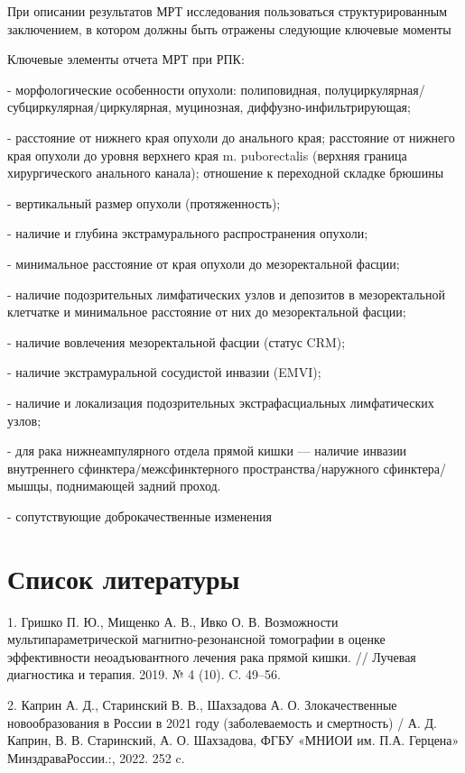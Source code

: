 \documentclass[
  russian,
  12pt,
  a4paper,
]{report}
\begin{document}
При описании результатов МРТ исследования пользоваться структурированным
заключением, в котором должны быть отражены следующие ключевые моменты

Ключевые элементы отчета МРТ при РПК:

- морфологические особенности опухоли: полиповидная, полуциркулярная/
субциркулярная/циркулярная, муцинозная, диффузно-инфильтрирующая;

- расстояние от нижнего края опухоли до анального края; расстояние от
нижнего края опухоли до уровня верхнего края m. puborectalis (верхняя
граница хирургического анального канала); отношение к переходной складке
брюшины

- вертикальный размер опухоли (протяженность);

- наличие и глубина экстрамурального распространения опухоли;

- минимальное расстояние от края опухоли до мезоректальной фасции;

- наличие подозрительных лимфатических узлов и депозитов в
мезоректальной клетчатке и минимальное расстояние от них до
мезоректальной фасции;

- наличие вовлечения мезоректальной фасции (статус CRM);

- наличие экстрамуральной сосудистой инвазии (EMVI);

- наличие и локализация подозрительных экстрафасциальных лимфатических
узлов;

- для рака нижнеампулярного отдела прямой кишки --- наличие инвазии
внутреннего сфинктера/межсфинктерного пространства/наружного
сфинктера/мышцы, поднимающей задний проход.

- сопутствующие доброкачественные изменения


\chapter{Список
литературы}\label{ux441ux43fux438ux441ux43eux43a-ux43bux438ux442ux435ux440ux430ux442ux443ux440ux44b}

1. Гришко П. Ю., Мищенко А. В., Ивко О. В. Возможности
мультипараметрической магнитно-резонансной томографии в оценке
эффективности неоадъювантного лечения рака прямой кишки. // Лучевая
диагностика и терапия. 2019. № 4 (10). C. 49--56.

2. Каприн А. Д., Старинский В. В., Шахзадова А. О. Злокачественные
новообразования в России в 2021 году (заболеваемость и смертность) / А.
Д. Каприн, В. В. Старинский, А. О. Шахзадова, ФГБУ «МНИОИ им. П.А.
Герцена» МинздраваРоссии.:, 2022. 252 c.
\end{document}

